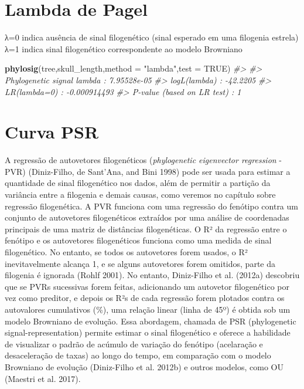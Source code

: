\documentclass[
]{book}
\newenvironment{Shaded}{\begin{snugshade}}{\end{snugshade}}
\newcommand{\AttributeTok}[1]{\textcolor[rgb]{0.13,0.29,0.53}{#1}}
\newcommand{\CommentTok}[1]{\textcolor[rgb]{0.56,0.35,0.01}{\textit{#1}}}
\newcommand{\ConstantTok}[1]{\textcolor[rgb]{0.56,0.35,0.01}{#1}}
\newcommand{\FunctionTok}[1]{\textcolor[rgb]{0.13,0.29,0.53}{\textbf{#1}}}
\newcommand{\NormalTok}[1]{#1}
\newcommand{\StringTok}[1]{\textcolor[rgb]{0.31,0.60,0.02}{#1}}
\begin{document}
\section{Lambda de Pagel}\label{lambda-de-pagel}

λ=0 indica ausência de sinal filogenético (sinal esperado em uma filogenia estrela) λ=1 indica sinal filogenético correspondente ao modelo Browniano

\begin{Shaded}
\begin{Highlighting}[]
\FunctionTok{phylosig}\NormalTok{(tree,skull\_length,}\AttributeTok{method =} \StringTok{"lambda"}\NormalTok{,}\AttributeTok{test =} \ConstantTok{TRUE}\NormalTok{)}
\CommentTok{\#\textgreater{} }
\CommentTok{\#\textgreater{} Phylogenetic signal lambda : 7.95528e{-}05 }
\CommentTok{\#\textgreater{} logL(lambda) : {-}42.2205 }
\CommentTok{\#\textgreater{} LR(lambda=0) : {-}0.000914493 }
\CommentTok{\#\textgreater{} P{-}value (based on LR test) : 1}
\end{Highlighting}
\end{Shaded}

\section{Curva PSR}\label{curva-psr}

A regressão de autovetores filogenéticos (\emph{phylogenetic eigenvector regression} - PVR) (Diniz-Filho, de Sant'Ana, and Bini 1998) pode ser usada para estimar a quantidade de sinal filogenético nos dados, além de permitir a partição da variância entre a filogenia e demais causas, como veremos no capítulo sobre regressão filogenética. A PVR funciona com uma regressão do fenótipo contra um conjunto de autovetores filogenéticos extraídos por uma análise de coordenadas principais de uma matriz de distâncias filogenéticas. O R² da regressão entre o fenótipo e os autovetores filogenéticos funciona como uma medida de sinal filogenético. No entanto, se todos os autovetores forem usados, o R² inevitavelmente alcança 1, e se alguns autovetores forem omitidos, parte da filogenia é ignorada (Rohlf 2001). No entanto, Diniz-Filho et al. (2012a) descobriu que se PVRs sucessivas forem feitas, adicionando um autovetor filogenético por vez como preditor, e depois os R²s de cada regressão forem plotados contra os autovalores cumulativos (\%), uma relação linear (linha de 45º) é obtida sob um modelo Browniano de evolução. Essa abordagem, chamada de PSR (phylogenetic signal-representation) permite estimar o sinal filogenético e oferece a habilidade de visualizar o padrão de acúmulo de variação do fenótipo (acelaração e desaceleração de taxas) ao longo do tempo, em comparação com o modelo Browniano de evolução (Diniz-Filho et al. 2012b) e outros modelos, como OU (Maestri et al. 2017).
\end{document}
